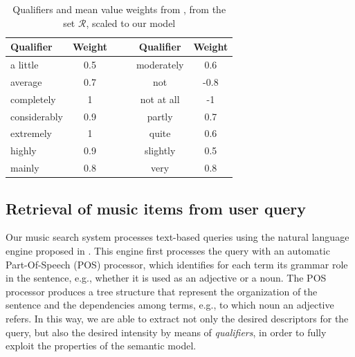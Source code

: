 \begin{table}[tbp]
\caption{Qualifiers and mean value weights from \cite{Rohrmann2003}, from the set $\mathcal{R}$, scaled to our model}
\label{tab:DCSMqualifiers}
\centering
\bgroup
\def\arraystretch{1.5}
\begin{tabular}{||lcc||lcc||}
\hline
\hline
Qualifier & Weight & &  & Qualifier & Weight \\
\hline
\hline
a little & 0.5 & & & moderately & 0.6 \\ 
average & 0.7 & &   & not & -0.8  \\
completely & 1 & &  & not at all &  -1\\  
considerably & 0.9 & &  & partly & 0.7  \\
extremely & 1 & &  & quite & 0.6  \\
highly & 0.9 &  &  & slightly & 0.5  \\
mainly &  0.8 &  &   & very & 0.8 \\
\hline 
\hline
\end{tabular}
\egroup
\end{table}

\subsection{Retrieval of music items from user query}
Our music search system processes text-based queries using the natural language engine proposed in \cite{Buccoli2013}. This engine first processes the query with an automatic Part-Of-Speech (POS) processor, which identifies for each term its grammar role in the sentence, e.g., whether it is used as an adjective or a noun. The POS processor produces a tree structure that represent the organization of the sentence and the dependencies among terms, e.g., to which noun an adjective refers. In this way, we are able to extract not only the desired descriptors for the query, but also the desired intensity by means of \textit{qualifiers}, in order to fully exploit the properties of the semantic model.


